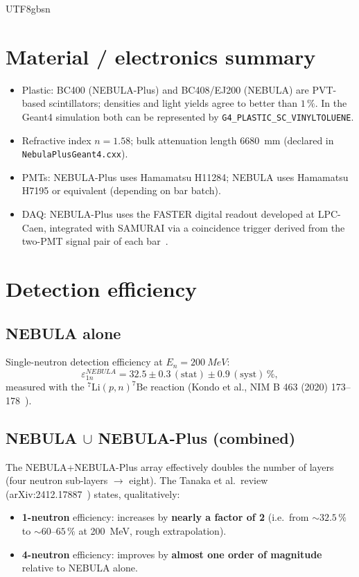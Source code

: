 \documentclass[11pt,a4paper]{article}
\newcommand{\NEB}{NEBULA}
\newcommand{\NPL}{NEBULA-Plus}
\begin{document}
\begin{CJK}{UTF8}{gbsn}
\section{Material / electronics summary}

\begin{itemize}
  \item Plastic: BC400 (\NPL{}) and BC408/EJ200 (\NEB{}) are PVT-based
        scintillators; densities and light yields agree to better than
        $1\,\%$. In the Geant4 simulation both can be represented by
        \texttt{G4\_PLASTIC\_SC\_VINYLTOLUENE}.
  \item Refractive index $n = 1.58$; bulk attenuation length \SI{6680}{mm}
        (declared in \texttt{NebulaPlusGeant4.cxx}).
  \item PMTs: \NPL{} uses Hamamatsu H11284; \NEB{} uses Hamamatsu H7195 or
        equivalent (depending on bar batch).
  \item DAQ: \NPL{} uses the FASTER digital readout developed at LPC-Caen,
        integrated with SAMURAI via a coincidence trigger derived from the
        two-PMT signal pair of each bar~\cite{aprApr2022}.
\end{itemize}

\section{Detection efficiency}

\subsection{\NEB{} alone}

Single-neutron detection efficiency at $E_n = \SI{200}{MeV}$:
\[
\varepsilon_{1n}^{\NEB{}} = 32.5 \pm 0.3\,(\text{stat}) \pm 0.9\,(\text{syst})\,\%,
\]
measured with the $^{7}\mathrm{Li}(p,n)^{7}\mathrm{Be}$ reaction
(Kondo et al., NIM B 463 (2020) 173--178~\cite{kondo2020nim}).

\subsection{\NEB{} $\cup$ \NPL{} (combined)}

The \NEB{}+\NPL{} array effectively doubles the number of layers
(four neutron sub-layers $\to$ eight). The Tanaka et al.\ review
(arXiv:2412.17887~\cite{tanaka2024}) states, qualitatively:

\begin{itemize}
  \item \textbf{1-neutron} efficiency: increases by \textbf{nearly a factor of 2}
        (i.e.\ from $\sim 32.5\,\%$ to $\sim 60\text{--}65\,\%$ at \SI{200}{MeV},
        rough extrapolation).
  \item \textbf{4-neutron} efficiency: improves by \textbf{almost one order of
        magnitude} relative to \NEB{} alone.
\end{itemize}


\end{CJK}
\end{document}
